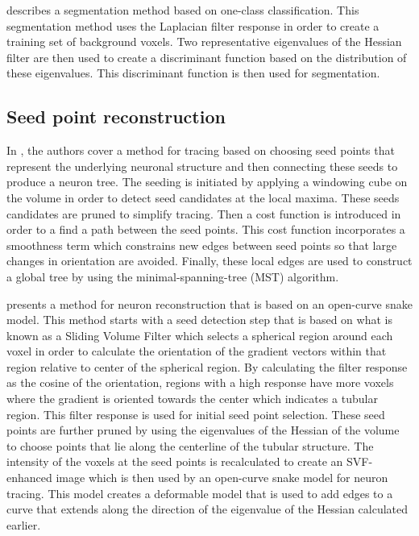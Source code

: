 \Textcite{Hernandez-Herrera2014} describes
a segmentation method based on one-class
classification. This segmentation method
uses the Laplacian filter response in
order to create a training set of
background voxels. Two representative
eigenvalues of the Hessian filter are then
used to create a discriminant function
based on the distribution of these
eigenvalues. This discriminant function is then used for
segmentation.

\subsection{Seed point reconstruction}

In \textcite{MICCAI-anisotropic-path-searching-Xie2010,MIA-anisotropic-path-searching-Xie2011},
the authors cover a method for tracing
based on choosing seed points that
represent the underlying neuronal
structure and then connecting these seeds
to produce a neuron tree. The seeding is
initiated by applying a windowing cube on
the volume in order to detect seed
candidates at the local maxima. These
seeds candidates are pruned to simplify
tracing. Then a cost function is
introduced in order to a find a path
between the seed points. This cost
function incorporates a smoothness term
which constrains new edges between seed
points so that large changes in
orientation are avoided. Finally, these
local edges are used to construct a
global tree by using the
minimal-spanning-tree (MST) algorithm.

\Textcite{Luo2015} presents a method for neuron
reconstruction that is based on an
open-curve snake model. This method
starts with a seed detection step that is
based on what is known as a Sliding Volume
Filter which selects a spherical region
around each voxel in order to calculate
the orientation of the gradient vectors
within that region relative to center of
the spherical region. By calculating the
filter response as the cosine of the
orientation, regions with a high response
have more voxels where the gradient is
oriented towards the center which
indicates a tubular region. This filter
response is used for initial seed point
selection. These seed points are further
pruned by using the eigenvalues of the
Hessian of the volume to choose points
that lie along the centerline of the
tubular structure. The intensity of the
voxels at the seed points is recalculated to
create an SVF-enhanced image which is then
used by an open-curve snake model for
neuron tracing. This model creates a
deformable model that is used to add edges
to a curve that extends along the
direction of the eigenvalue of the Hessian
calculated earlier.

